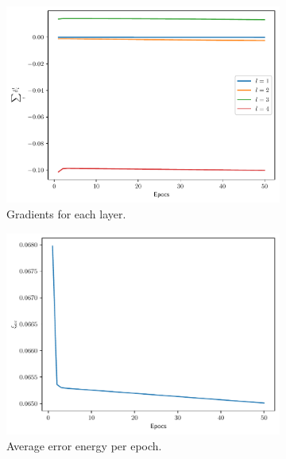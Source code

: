 \documentclass[conference]{IEEEtran}
\theoremstyle{definition}
\theoremstyle{remark}
\theoremstyle{remark}
\begin{document}
\begin{figure}
  \centering
  \begin{subfigure}[b]{0.32\textwidth}
    \centering \includegraphics[width=\textwidth]{figs/1-2-3-0.9-gradients.pdf}
    \caption{Gradients for each layer.}
    \label{subfig:grad-worst-NN}
  \end{subfigure}
  \begin{subfigure}[b]{0.32\textwidth}
    \centering \includegraphics[width=\textwidth]{figs/1-2-3-0.9-error.pdf}
    \caption{Average error energy per epoch.}
    \label{subfig:error-worst-NN}
  \end{subfigure}
  \begin{subfigure}[b]{0.32\textwidth}

\end{subfigure}
\end{figure}
\end{document}
